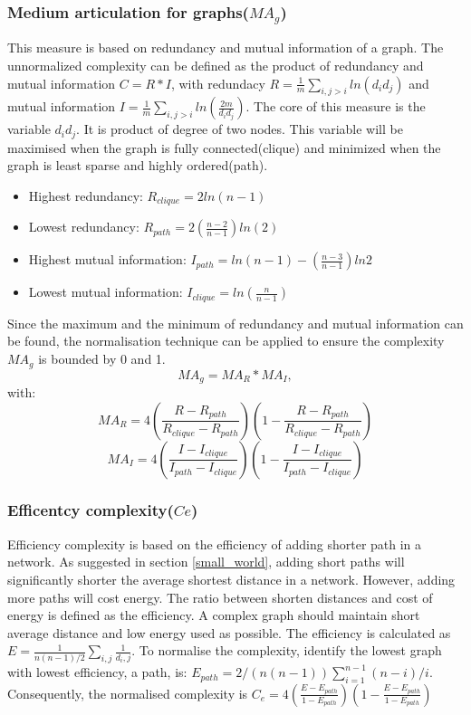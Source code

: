 \documentclass[12pt]{article}
\begin{document}
\subsubsection{Medium articulation for graphs($MA_g$)}
\label{magdefinition}
This measure is based on redundancy and mutual information of a graph.\cite{wilhelm2007information} The unnormalized complexity can be defined as the product of redundancy and mutual information $C=R*I$, with redundacy $R=\frac{1}{m}\sum_{i,j>i}ln(d_id_j)$ and mutual information $I=\frac{1}{m}\sum_{i,j>i}ln(\frac{2m}{d_id_j})$. The core of this measure is the variable $d_id_j$. It is product of degree of two nodes. This variable will be maximised when the graph is fully connected(clique) and minimized when the graph is least sparse and highly ordered(path).
\begin{itemize}
    \item Highest redundancy: $R_{clique} = 2ln(n-1)$
    \item Lowest redundancy: $R_{path} = 2(\frac{n-2}{n-1})ln(2)$
    \item Highest mutual information: $I_{path} = ln(n-1)-(\frac{n-3}{n-1})ln2$
    \item Lowest mutual information: $I_{clique}=ln(\frac{n}{n-1})$
\end{itemize}
\par
Since the maximum and the minimum of redundancy and mutual information can be found, the normalisation technique can be applied to ensure the complexity $MA_g$ is bounded by 0 and 1.
\begin{equation}
    MA_g=MA_R*MA_I,
\end{equation}
with:
\begin{equation}
    MA_R=4(\frac{R-R_{path}}{R_{clique}-R_{path}})(1-\frac{R-R_{path}}{R_{clique}-R_{path}})
\end{equation}
\begin{equation}
    MA_I=4(\frac{I-I_{clique}}{I_{path}-I_{clique}})(1-\frac{I-I_{clique}}{I_{path}-I_{clique}})
\end{equation}
\subsubsection{Efficentcy complexity($Ce$)}
Efficiency complexity is based on the efficiency of adding shorter path in a network.\cite{latora2003economic} As suggested in section \ref{small_world}, adding short paths will significantly shorter the average shortest distance in a network. However, adding more paths will cost energy. The ratio between shorten distances and cost of energy is defined as the efficiency. A complex graph should maintain short average distance and low energy used as possible. The efficiency is calculated as $E=\frac{1}{n(n-1)/2}\sum_{i,j}\frac{1}{d_i,j}$. To normalise the complexity, identify the lowest graph with lowest efficiency, a path, is: $E_{path} = 2/(n(n-1))\sum_{i=1}^{n-1}(n-i)/i$. Consequently, the normalised complexity is $C_e=4(\frac{E-E_{path}}{1-E_{path}})(1-\frac{E-E_{path}}{1-E_{path}})$
\end{document}

